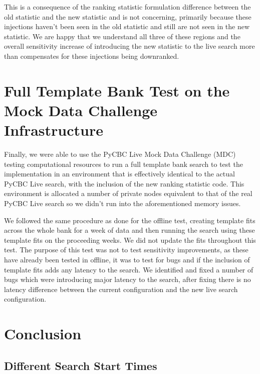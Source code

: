 This is a consequence of the ranking statistic formulation difference between the old statistic and the new statistic and is not concerning, primarily because these injections haven't been seen in the old statistic and still are not seen in the new statistic. We are happy that we understand all three of these regions and the overall sensitivity increase of introducing the new statistic to the live search more than compensates for these injections being downranked.

\section{\label{sec:pycbclive-mdc-test}Full Template Bank Test on the Mock Data Challenge Infrastructure}

Finally, we were able to use the PyCBC Live Mock Data Challenge (MDC) testing computational resources to run a full template bank search to test the implementation in an environment that is effectively identical to the actual PyCBC Live search, with the inclusion of the new ranking statistic code. This environment is allocated a number of private nodes equivalent to that of the real PyCBC Live search so we didn't run into the aforementioned memory issues.

We followed the same procedure as done for the offline test, creating template fits across the whole bank for a week of data and then running the search using these template fits on the proceeding weeks. We did not update the fits throughout this test. The purpose of this test was not to test sensitivity improvements, as these have already been tested in offline, it was to test for bugs and if the inclusion of template fits adds any latency to the search. We identified and fixed a number of bugs which were introducing major latency to the search, after fixing there is no latency difference between the current configuration and the new live search configuration.

\section{\label{sec:pycbclive-conclusion}Conclusion}







\subsection{\label{sec:pycbclive-diff-start-times}Different Search Start Times}

